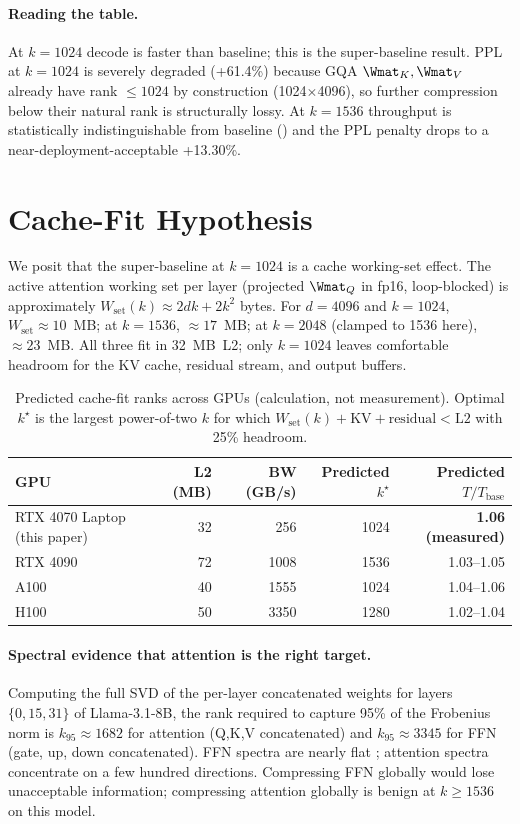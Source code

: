 \documentclass[11pt]{article}
\begin{document}
\paragraph{Reading the table.}
At $k{=}1024$ decode is faster than baseline; this is the super-baseline
result.  PPL at $k{=}1024$ is severely degraded (+61.4\%) because GQA
$\Wmat_K,\Wmat_V$ already have rank $\leq 1024$ by construction (1024$\times$4096),
so further compression below their natural rank is structurally lossy.  At
$k{=}1536$ throughput is statistically indistinguishable from baseline
() and the PPL penalty drops to a near-deployment-acceptable
+13.30\%.

\section{Cache-Fit Hypothesis}
\label{sec:cachefit}
We posit that the super-baseline at $k{=}1024$ is a cache working-set effect.
The active attention working set per layer (projected $\Wmat_Q$ in fp16,
loop-blocked) is approximately $W_\text{set}(k) \approx 2 d k\!+\!2 k^2$ bytes.
For $d{=}4096$ and $k{=}1024$, $W_\text{set}\!\approx\!10$~MB; at $k{=}1536$,
$\approx\!17$~MB; at $k{=}2048$ (clamped to 1536 here), $\approx\!23$~MB.  All
three fit in 32~MB~L2; only $k{=}1024$ leaves comfortable headroom for the KV
cache, residual stream, and output buffers.

\begin{table}[h]\centering\small
\caption{Predicted cache-fit ranks across GPUs (calculation, not
measurement).  Optimal $k^\star$ is the largest power-of-two $k$ for which
$W_\text{set}(k)+\text{KV}+\text{residual}\!<\!\text{L2}$ with 25\% headroom.}
\label{tab:predict}
\begin{tabular}{@{}lrrrr@{}}
\toprule
GPU & L2 (MB) & BW (GB/s) & Predicted $k^\star$ & Predicted $T/T_\text{base}$ \\
\midrule
RTX 4070 Laptop (this paper) & 32 & 256 & 1024 & \textbf{1.06 (measured)} \\
RTX 4090 & 72 & 1008 & 1536 & 1.03--1.05 \\
A100 & 40 & 1555 & 1024 & 1.04--1.06 \\
H100 & 50 & 3350 & 1280 & 1.02--1.04 \\
\bottomrule
\end{tabular}
\end{table}

\paragraph{Spectral evidence that attention is the right target.}
Computing the full SVD of the per-layer concatenated weights for layers
$\{0,15,31\}$ of Llama-3.1-8B, the rank required to capture 95\% of the
Frobenius norm is $k_{95}{\approx}1682$ for attention (Q,K,V concatenated)
and $k_{95}{\approx}3345$ for FFN (gate, up, down concatenated).  FFN
spectra are nearly flat \cite{geva2021ffn}; attention spectra concentrate
on a few hundred directions.  Compressing FFN globally would lose
unacceptable information; compressing attention globally is benign at
$k\!\geq\!1536$ on this model.
\end{document}
